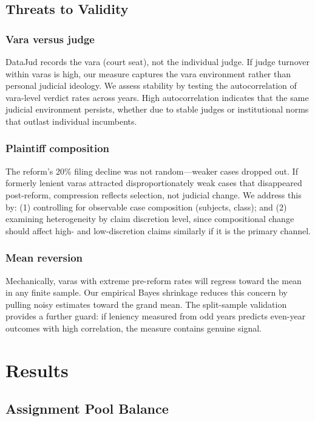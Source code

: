 \documentclass[12pt]{article}
\begin{document}
\subsection{Threats to Validity}

\subsubsection*{Vara versus judge} DataJud records the vara (court seat), not the individual judge. If judge turnover within varas is high, our measure captures the vara environment rather than personal judicial ideology. We assess stability by testing the autocorrelation of vara-level verdict rates across years. High autocorrelation indicates that the same judicial environment persists, whether due to stable judges or institutional norms that outlast individual incumbents.

\subsubsection*{Plaintiff composition} The reform's 20\% filing decline was not random---weaker cases dropped out. If formerly lenient varas attracted disproportionately weak cases that disappeared post-reform, compression reflects selection, not judicial change. We address this by: (1) controlling for observable case composition (subjects, class); and (2) examining heterogeneity by claim discretion level, since compositional change should affect high- and low-discretion claims similarly if it is the primary channel.

\subsubsection*{Mean reversion} Mechanically, varas with extreme pre-reform rates will regress toward the mean in any finite sample. Our empirical Bayes shrinkage reduces this concern by pulling noisy estimates toward the grand mean. The split-sample validation provides a further guard: if leniency measured from odd years predicts even-year outcomes with high correlation, the measure contains genuine signal.

\section{Results}

\subsection{Assignment Pool Balance}
\end{document}
